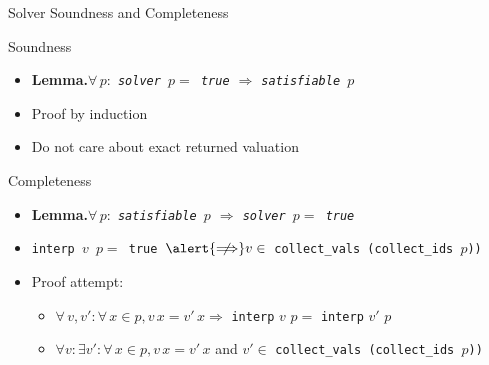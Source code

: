 \documentclass[aspectratio=169,xcolor=dvipsnames]{beamer}
\begin{document}
    \begin{frame}{Solver Soundness and Completeness}
        \begin{block}{Soundness}
            \begin{itemize}
                \item \textbf{Lemma.}\hspace*{8pt}\emph{$\forall\,p :$ \texttt{solver $p =$\,true} $\Longrightarrow$ \texttt{satisfiable $p$}}
                \item Proof by induction
                \item Do \alert{not} care about \alert{exact} returned valuation
            \end{itemize}
        \end{block}

        \pause

        \begin{block}{Completeness}
            \begin{itemize}
                \item \textbf{Lemma.}\hspace*{8pt}\emph{$\forall\,p :$ \texttt{satisfiable $p$} $\Longrightarrow$ \texttt{solver $p =$\,true}}
                \item \texttt{interp $v$ $p =$\,true $\alert{\centernot\Longrightarrow} v \in$ collect\_vals\,(collect\_ids $p$))}
                \pause
                \item Proof attempt:
                \begin{itemize}
                    \item $\forall\,v, v' : \forall\,x \in p, v\,x = v'\,x \Longrightarrow$ \texttt{interp} $v$ $p =$ \texttt{interp} $v'$ $p$
                    \item $\forall v : \exists v' : \forall\,x \in p, v\,x = v'\,x$ and $v' \in$ \texttt{collect\_vals\,(collect\_ids $p$))} 
                \end{itemize}
            \end{itemize}
        \end{block}

    \end{frame}
\end{document}
